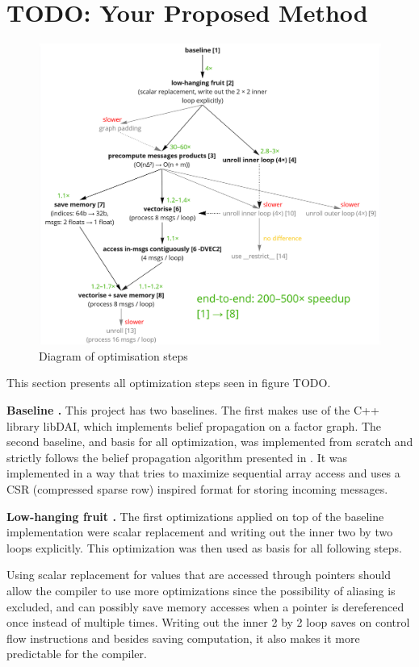 \documentclass[letterpaper]{article}
\let\cref=\Cref %
\newcommand{\mypar}[1]{{\bf #1.}}
\begin{document}
\section{TODO: Your Proposed Method}\label{sec:yourmethod}
\begin{figure}\centering
	\includegraphics[width = 0.48 \textwidth]{img/OptimizationDiagram.png}
	\caption{Diagram of optimisation steps \label{OptDiagram}}
\end{figure}

This section presents all optimization steps seen in figure TODO.

\mypar{Baseline }
This project has two baselines. The first makes use of the C++ library libDAI, which implements belief propagation on a factor graph.
The second baseline, and basis for all optimization, was implemented from scratch and strictly follows the belief propagation algorithm presented in \cref{sec:background}. It was implemented in a way that tries to maximize sequential array access and uses a CSR (compressed sparse row) inspired format for storing incoming messages.

\mypar{Low-hanging fruit }
The first optimizations applied on top of the baseline implementation were scalar replacement and writing out the inner two by two loops explicitly.  This optimization was then used as basis for all following steps.

Using scalar replacement for values that are accessed through pointers should allow the compiler to use more optimizations since the possibility of aliasing is excluded, and can possibly save memory accesses when a pointer is dereferenced once instead of multiple times.
Writing out the inner 2 by 2 loop saves on control flow instructions and besides saving computation, it also makes it more predictable for the compiler. 
\end{document}
